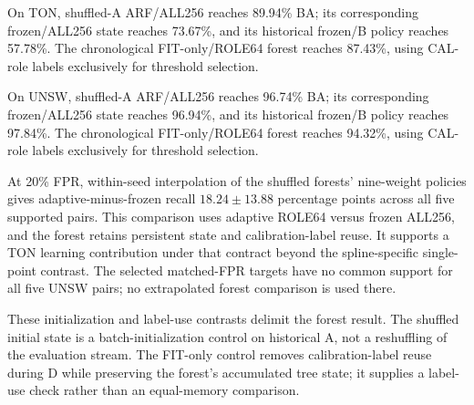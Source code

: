 On TON, shuffled-A ARF/ALL256 reaches 89.94\% BA; its corresponding frozen/ALL256 state reaches 73.67\%, and its historical frozen/B policy reaches 57.78\%. The chronological FIT-only/ROLE64 forest reaches 87.43\%, using CAL-role labels exclusively for threshold selection.

On UNSW, shuffled-A ARF/ALL256 reaches 96.74\% BA; its corresponding frozen/ALL256 state reaches 96.94\%, and its historical frozen/B policy reaches 97.84\%. The chronological FIT-only/ROLE64 forest reaches 94.32\%, using CAL-role labels exclusively for threshold selection.

At 20\% FPR, within-seed interpolation of the shuffled forests' nine-weight policies gives adaptive-minus-frozen recall $18.24 \pm 13.88$ percentage points across all five supported pairs. This comparison uses adaptive ROLE64 versus frozen ALL256, and the forest retains persistent state and calibration-label reuse. It supports a TON learning contribution under that contract beyond the spline-specific single-point contrast. The selected matched-FPR targets have no common support for all five UNSW pairs; no extrapolated forest comparison is used there.

These initialization and label-use contrasts delimit the forest result. The shuffled initial state is a batch-initialization control on historical A, not a reshuffling of the evaluation stream. The FIT-only control removes calibration-label reuse during D while preserving the forest's accumulated tree state; it supplies a label-use check rather than an equal-memory comparison.
